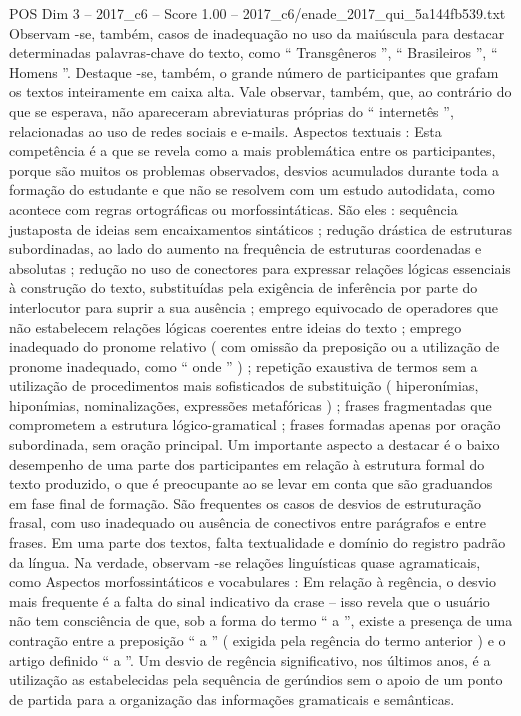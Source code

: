 \begin{textsample}{POS Dim 3 – 2017\_c6 – Score 1.00 – 2017\_c6/enade\_2017\_qui\_5a144fb539.txt}
Observam -se, também, casos de inadequação no uso da maiúscula para destacar determinadas palavras-chave do texto, como “ Transgêneros ”, “ Brasileiros ”, “ Homens ”.
Destaque -se, também, o grande número de participantes que grafam os textos inteiramente em caixa alta.
Vale observar, também, que, ao contrário do que se esperava, não apareceram abreviaturas próprias do “ internetês ”, relacionadas ao uso de redes sociais e e-mails.
Aspectos textuais : Esta competência é a que se revela como a mais problemática entre os participantes, porque são muitos os problemas observados, desvios acumulados durante toda a formação do estudante e que não se resolvem com um estudo autodidata, como acontece com regras ortográficas ou morfossintáticas.
São eles : sequência justaposta de ideias sem encaixamentos sintáticos ; redução drástica de estruturas subordinadas, ao lado do aumento na frequência de estruturas coordenadas e absolutas ; redução no uso de conectores para expressar relações lógicas essenciais à construção do texto, substituídas pela exigência de inferência por parte do interlocutor para suprir a sua ausência ; emprego equivocado de operadores que não estabelecem relações lógicas coerentes entre ideias do texto ; emprego inadequado do pronome relativo ( com omissão da preposição ou a utilização de pronome inadequado, como “ onde ” ) ; repetição exaustiva de termos sem a utilização de procedimentos mais sofisticados de substituição ( hiperonímias, hiponímias, nominalizações, expressões metafóricas ) ; frases fragmentadas que comprometem a estrutura lógico-gramatical ; frases formadas apenas por oração subordinada, sem oração principal.
Um importante aspecto a destacar é o baixo desempenho de uma parte dos participantes em relação à estrutura formal do texto produzido, o que é preocupante ao se levar em conta que são graduandos em fase final de formação.
São frequentes os casos de desvios de estruturação frasal, com uso inadequado ou ausência de conectivos entre parágrafos e entre frases.
Em uma parte dos textos, falta textualidade e domínio do registro padrão da língua.
Na verdade, observam -se relações linguísticas quase agramaticais, como Aspectos morfossintáticos e vocabulares : Em relação à regência, o desvio mais frequente é a falta do sinal indicativo da crase – isso revela que o usuário não tem consciência de que, sob a forma do termo “ a ”, existe a presença de uma contração entre a preposição “ a ” ( exigida pela regência do termo anterior ) e o artigo definido “ a ”.
Um desvio de regência significativo, nos últimos anos, é a utilização as estabelecidas pela sequência de gerúndios sem o apoio de um ponto de partida para a organização das informações gramaticais e semânticas.

\end{textsample}
